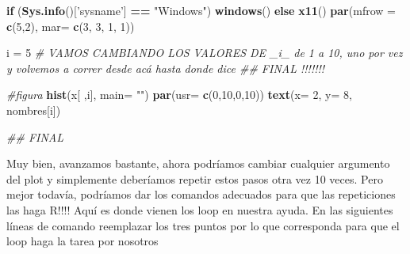 \documentclass[]{book}
\newenvironment{Shaded}{\begin{snugshade}}{\end{snugshade}}
\newcommand{\CommentTok}[1]{\textcolor[rgb]{0.56,0.35,0.01}{\textit{#1}}}
\newcommand{\ControlFlowTok}[1]{\textcolor[rgb]{0.13,0.29,0.53}{\textbf{#1}}}
\newcommand{\DataTypeTok}[1]{\textcolor[rgb]{0.13,0.29,0.53}{#1}}
\newcommand{\DecValTok}[1]{\textcolor[rgb]{0.00,0.00,0.81}{#1}}
\newcommand{\KeywordTok}[1]{\textcolor[rgb]{0.13,0.29,0.53}{\textbf{#1}}}
\newcommand{\NormalTok}[1]{#1}
\newcommand{\OperatorTok}[1]{\textcolor[rgb]{0.81,0.36,0.00}{\textbf{#1}}}
\newcommand{\StringTok}[1]{\textcolor[rgb]{0.31,0.60,0.02}{#1}}
\begin{document}
\begin{Shaded}
\begin{Highlighting}[]
\ControlFlowTok{if}\NormalTok{ (}\KeywordTok{Sys.info}\NormalTok{()[}\StringTok{'sysname'}\NormalTok{] }\OperatorTok{==}\StringTok{ "Windows"}\NormalTok{) }\KeywordTok{windows}\NormalTok{() }\ControlFlowTok{else} \KeywordTok{x11}\NormalTok{() }
\KeywordTok{par}\NormalTok{(}\DataTypeTok{mfrow =} \KeywordTok{c}\NormalTok{(}\DecValTok{5}\NormalTok{,}\DecValTok{2}\NormalTok{), }\DataTypeTok{mar=} \KeywordTok{c}\NormalTok{(}\DecValTok{3}\NormalTok{, }\DecValTok{3}\NormalTok{, }\DecValTok{1}\NormalTok{, }\DecValTok{1}\NormalTok{))}

\NormalTok{i =}\StringTok{ }\DecValTok{5} \CommentTok{# VAMOS CAMBIANDO LOS VALORES DE _i_ de 1 a 10, uno por vez y volvemos a correr desde acá hasta donde dice ## FINAL !!!!!!!}

\CommentTok{#figura}
\KeywordTok{hist}\NormalTok{(x[ ,i], }\DataTypeTok{main=} \StringTok{""}\NormalTok{)}
\KeywordTok{par}\NormalTok{(}\DataTypeTok{usr=} \KeywordTok{c}\NormalTok{(}\DecValTok{0}\NormalTok{,}\DecValTok{10}\NormalTok{,}\DecValTok{0}\NormalTok{,}\DecValTok{10}\NormalTok{))}
\KeywordTok{text}\NormalTok{(}\DataTypeTok{x=} \DecValTok{2}\NormalTok{, }\DataTypeTok{y=} \DecValTok{8}\NormalTok{, nombres[i])}

\CommentTok{## FINAL}
\end{Highlighting}
\end{Shaded}

Muy bien, avanzamos bastante, ahora podríamos cambiar cualquier argumento del plot y simplemente deberíamos repetir estos pasos otra vez 10 veces. Pero mejor todavía, podríamos dar los comandos adecuados para que las repeticiones las haga R!!!! Aquí es donde vienen los loop en nuestra ayuda. En las siguientes líneas de comando reemplazar los tres puntos por lo que corresponda para que el loop haga la tarea por nosotros
\end{document}

